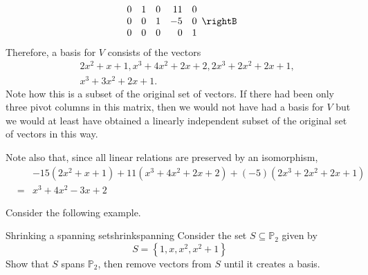 \begin{solution}
\begin{equation*}
\begin{array}{rrrrr}
0 & 1 & 0 & 11 & 0 \\ 
0 & 0 & 1 & -5 & 0 \\ 
0 & 0 & 0 & 0 & 1
\end{array}
\rightB
\end{equation*}
Therefore, a basis for $V$ consists of the vectors
\begin{eqnarray*}
&&2x^{2}+x+1,x^{3}+4x^{2}+2x+2,2x^{3}+2x^{2}+2x+1, \\
&&x^{3}+3x^{2}+2x+1.
\end{eqnarray*}
Note how this is a subset of the original set of vectors. If there had been
only three pivot columns in this matrix, then we would not have had a basis
for $V$ but we would at least have obtained a linearly independent subset of
the original set of vectors in this way. 

Note also that, since all linear relations are preserved by an isomorphism,
\begin{eqnarray*}
&&-15\left( 2x^{2}+x+1\right) +11\left( x^{3}+4x^{2}+2x+2\right) +\left(
-5\right) \left( 2x^{3}+2x^{2}+2x+1\right) \\
&=&x^{3}+4x^{2}-3x+2
\end{eqnarray*}

\end{solution}

Consider the following example.

\begin{example}{Shrinking a spanning set}{shrinkspanning}
Consider the set $S \subseteq \mathbb{P}_2$ given by 
\[
S = \left\{ 1, x, x^2, x^2 + 1 \right\}
\]
Show that $S$ spans $\mathbb{P}_2$, then remove vectors from $S$ until it creates a basis. 
\end{example}

